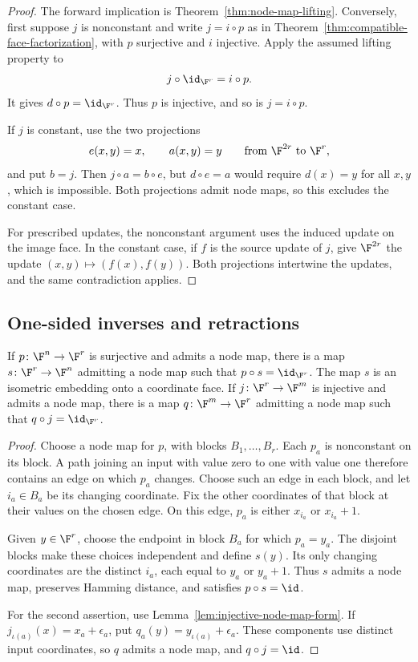 \begin{proof}
The forward implication is Theorem~\ref{thm:node-map-lifting}. Conversely, first suppose $j$ is nonconstant and write $j=i\circ p$ as in Theorem~\ref{thm:compatible-face-factorization}, with $p$ surjective and $i$ injective. Apply the assumed lifting property to
\[
    j\circ\id_{\F^r}=i\circ p.
\]
It gives $d\circ p=\id_{\F^r}$. Thus $p$ is injective, and so is $j=i\circ p$.

If $j$ is constant, use the two projections
\[
    e(x,y)=x,\qquad a(x,y)=y
    \qquad\text{from }\F^{2r}\text{ to }\F^r,
\]
and put $b=j$. Then $j\circ a=b\circ e$, but $d\circ e=a$ would require $d(x)=y$ for all $x,y$, which is impossible. Both projections admit node maps, so this excludes the constant case.

For prescribed updates, the nonconstant argument uses the induced update on the image face. In the constant case, if $f$ is the source update of $j$, give $\F^{2r}$ the update $(x,y)\mapsto(f(x),f(y))$. Both projections intertwine the updates, and the same contradiction applies.
\end{proof}

\subsection{One-sided inverses and retractions}\label{subsec:node-map-retractions}

\begin{proposition}\label{prop:compatible-one-sided-inverses}
If $p\colon\F^n\to\F^r$ is surjective and admits a node map, there is a map $s\colon\F^r\to\F^n$ admitting a node map such that $p\circ s=\id_{\F^r}$. The map $s$ is an isometric embedding onto a coordinate face. If $j\colon\F^r\to\F^m$ is injective and admits a node map, there is a map $q\colon\F^m\to\F^r$ admitting a node map such that $q\circ j=\id_{\F^r}$.
\end{proposition}

\begin{proof}
Choose a node map for $p$, with blocks $B_1,\ldots,B_r$. Each $p_a$ is nonconstant on its block. A path joining an input with value zero to one with value one therefore contains an edge on which $p_a$ changes. Choose such an edge in each block, and let $i_a\in B_a$ be its changing coordinate. Fix the other coordinates of that block at their values on the chosen edge. On this edge, $p_a$ is either $x_{i_a}$ or $x_{i_a}+1$.

Given $y\in\F^r$, choose the endpoint in block $B_a$ for which $p_a=y_a$. The disjoint blocks make these choices independent and define $s(y)$. Its only changing coordinates are the distinct $i_a$, each equal to $y_a$ or $y_a+1$. Thus $s$ admits a node map, preserves Hamming distance, and satisfies $p\circ s=\id$.

For the second assertion, use Lemma~\ref{lem:injective-node-map-form}. If $j_{\iota(a)}(x)=x_a+\epsilon_a$, put $q_a(y)=y_{\iota(a)}+\epsilon_a$. These components use distinct input coordinates, so $q$ admits a node map, and $q\circ j=\id$.
\end{proof}

